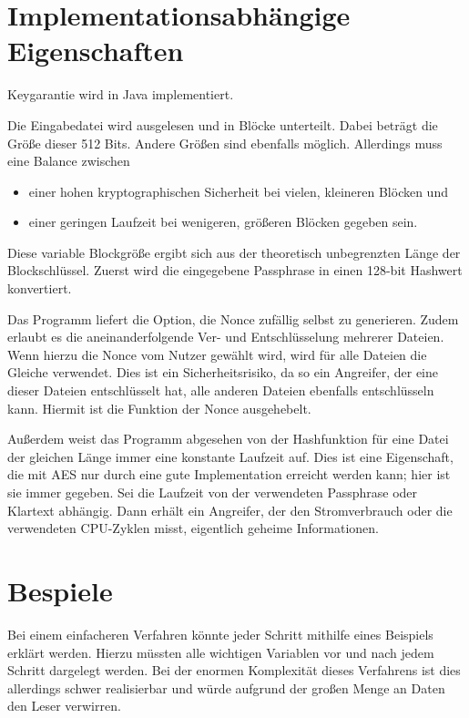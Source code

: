 \documentclass[10pt,a4paper]{article}
\begin{document}
\section{Implementationsabhängige Eigenschaften}

Keygarantie wird in Java implementiert.

Die Eingabedatei wird ausgelesen und in Blöcke unterteilt.
Dabei beträgt die Größe dieser 512 Bits.
Andere Größen sind ebenfalls möglich.
Allerdings muss eine Balance zwischen
\begin{itemize}
    \item einer hohen kryptographischen Sicherheit bei vielen, kleineren Blöcken und
    \item einer geringen Laufzeit bei wenigeren, größeren Blöcken gegeben sein.
\end{itemize}

Diese variable Blockgröße ergibt sich aus der theoretisch unbegrenzten Länge der Blockschlüssel.
Zuerst wird die eingegebene Passphrase in einen 128-bit Hashwert konvertiert.

Das Programm liefert die Option, die Nonce zufällig selbst zu generieren.
Zudem erlaubt es die aneinanderfolgende Ver- und Entschlüsselung mehrerer Dateien.
Wenn hierzu die Nonce vom Nutzer gewählt wird, wird für alle Dateien die Gleiche verwendet.
Dies ist ein Sicherheitsrisiko, da so ein Angreifer, der eine dieser Dateien entschlüsselt hat, alle anderen Dateien ebenfalls entschlüsseln kann.
Hiermit ist die Funktion der Nonce ausgehebelt.

Außerdem weist das Programm abgesehen von der Hashfunktion für eine Datei der gleichen Länge immer eine konstante Laufzeit auf.
Dies ist eine Eigenschaft, die mit AES nur durch eine gute Implementation erreicht werden kann\cite{Pitchaiah2012}; hier ist sie immer gegeben.
Sei die Laufzeit von der verwendeten Passphrase oder Klartext abhängig.
Dann erhält ein Angreifer, der den Stromverbrauch oder die verwendeten CPU-Zyklen misst, eigentlich geheime Informationen.

\section{Bespiele}

Bei einem einfacheren Verfahren könnte jeder Schritt mithilfe eines Beispiels erklärt werden.
Hierzu müssten alle wichtigen Variablen vor und nach jedem Schritt dargelegt werden.
Bei der enormen Komplexität dieses Verfahrens ist dies allerdings schwer realisierbar und würde aufgrund der großen Menge an Daten den Leser verwirren.
\end{document}
